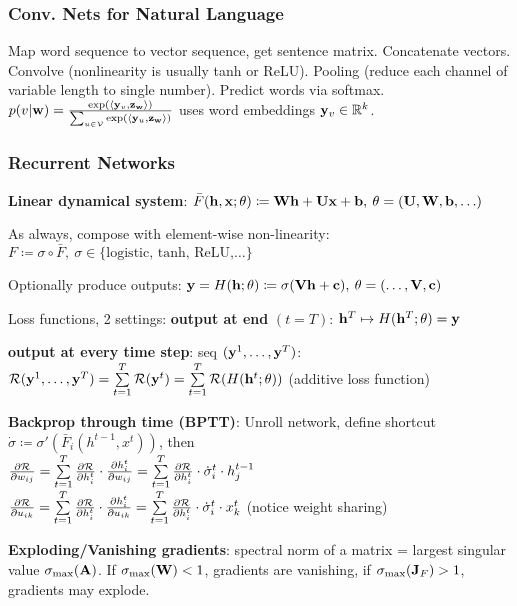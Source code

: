     \subsubsection{Conv. Nets for Natural Language}
    \label{ssub:convnetsfornl}
    Map word sequence to vector sequence, get sentence matrix. Concatenate vectors. Convolve (nonlinearity is usually tanh or ReLU). Pooling (reduce each channel of variable length to single number). Predict words via softmax.
    $p(v|\mathbf w)=\frac{\exp(\langle\mathbf y_v,\mathbf z_\mathbf w\rangle)}{\sum_{u\in\mathcal{V}}\exp(\langle\mathbf y_u,\mathbf z_\mathbf w\rangle)}$
    uses word embeddings $\mathbf y_v\in\mathbb R^k$.
    \subsubsection{Recurrent Networks}
    \label{ssub:recurrentnets}
    
    \textbf{Linear dynamical system}: $\bar{F}(\mathbf h,\mathbf x;\theta)\coloneqq\mathbf W \mathbf h+\mathbf U \mathbf x + \mathbf b,\>\theta=(\mathbf U,\mathbf W,\mathbf b,\ldots)$
    
    As always, compose with element-wise non-linearity:\\ \tab$F\coloneqq\sigma\circ\bar{F},\>\sigma\in\{\text{logistic, tanh, ReLU,\ldots}\}$
    
    Optionally produce outputs: $\mathbf y=H(\mathbf h;\theta)\coloneqq\sigma(\mathbf V\mathbf h+\mathbf c),\>\theta=(\ldots,\mathbf V,\mathbf c)$
    
    Loss functions, 2 settings: \textbf{output at end} $(t=T)$: $\mathbf h^T\mapsto H(\mathbf h^T;\theta)=\mathbf y$
    
   \textbf{ output at every time step}: seq $(\mathbf y^1,\ldots,\mathbf y^T)$:\\ \tab$\mathcal{R}(\mathbf y^1,\ldots,\mathbf y^T)=\sum\limits^T_{t=1}\mathcal{R}(\mathbf y^t)=\sum\limits^T_{t=1}\mathcal{R}(H(\mathbf h^t;\theta))$
   (additive loss function)
    
    \textbf{Backprop through time (BPTT)}: Unroll network, define shortcut\\ \tab$\dot{\sigma}\coloneqq\sigma'(\bar{F}_i(h^{t-1},x^t))$, then\\
    
    \tab$\frac{\partial\mathcal{R}}{\partial w_{ij}}=\sum\limits_{t=1}^{T}\frac{\partial \mathcal{R}}{\partial h^t_i}\cdot\frac{\partial h^{t}_{i}}{\partial w_{ij}}=\sum\limits_{t=1}^{T}\frac{\partial\mathcal{R}}{\partial h^t_i}\cdot\dot{\sigma}^t_i\cdot h^{t-1}_{j}$\\
    \tab$\frac{\partial\mathcal{R}}{\partial u_{ik}}=\sum\limits_{t=1}^{T}\frac{\partial \mathcal{R}}{\partial h^t_i}\cdot\frac{\partial h^{t}_{i}}{\partial u_{ik}}=\sum\limits_{t=1}^{T}\frac{\partial\mathcal{R}}{\partial h^t_i}\cdot\dot{\sigma}^t_i\cdot x^{t}_{k}$ (notice weight sharing)
    
    \textbf{Exploding/Vanishing gradients}: spectral norm of a matrix = largest singular value $\sigma_{\max}(\mathbf A)$. If $\sigma_{\max}(\mathbf W)<1$, gradients are vanishing, if $\sigma_{\max}(\mathbf J_F) >1$, gradients may explode.
